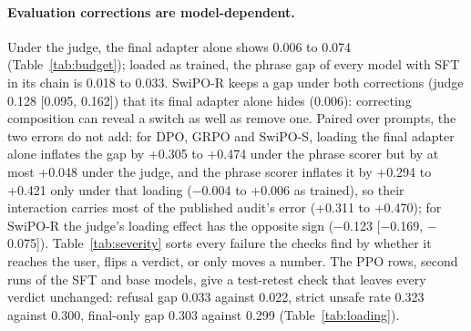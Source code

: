 \paragraph{Evaluation corrections are model-dependent.} Under the judge, the final adapter alone shows 0.006 to 0.074 (Table~\ref{tab:budget}); loaded as trained, the phrase gap of every model with SFT in its chain is 0.018 to 0.033. \mbox{SwiPO-R} keeps a gap under both corrections (judge 0.128 [0.095, 0.162]) that its final adapter alone hides (0.006): correcting composition can reveal a switch as well as remove one. Paired over prompts, the two errors do not add: for DPO, GRPO and \mbox{SwiPO-S}, loading the final adapter alone inflates the gap by +0.305 to +0.474 under the phrase scorer but by at most +0.048 under the judge, and the phrase scorer inflates it by +0.294 to +0.421 only under that loading ($-$0.004 to +0.006 as trained), so their interaction carries most of the published audit's error (+0.311 to +0.470); for \mbox{SwiPO-R} the judge's loading effect has the opposite sign ($-$0.123 [$-$0.169, $-$0.075]). Table~\ref{tab:severity} sorts every failure the checks find by whether it reaches the user, flips a verdict, or only moves a number. The PPO rows, second runs of the SFT and base models, give a test-retest check that leaves every verdict unchanged: refusal gap 0.033 against 0.022, strict unsafe rate 0.323 against 0.300, final-only gap 0.303 against 0.299 (Table~\ref{tab:loading}).
